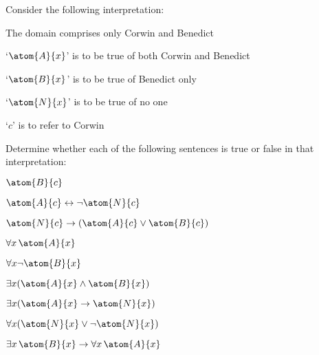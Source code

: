 \practiceproblems
\solutions
\problempart
\label{pr.TorF1}
Consider the following interpretation:
	\begin{ebullet}
		\item The domain comprises only Corwin and Benedict
		\item `$\atom{A}{x}$' is to be true of both Corwin and Benedict
		\item `$\atom{B}{x}$' is to be true of Benedict only
		\item `$\atom{N}{x}$' is to be true of no one
		\item `$c$' is to refer to Corwin
	\end{ebullet}
Determine whether each of the following sentences is true or false in that interpretation:
\begin{earg}
\item $\atom{B}{c} $
\item $\atom{A}{c}  \eiff \enot \atom{N}{c}$
\item $\atom{N}{c}  \eif (\atom{A}{c} \eor \atom{B}{c})$
\item $\forall x\, \atom{A}{x}$
\item $\forall x \enot \atom{B}{x}$
\item $\exists x(\atom{A}{x} \eand \atom{B}{x})$
\item $\exists x(\atom{A}{x} \eif \atom{N}{x})$
\item $\forall x(\atom{N}{x} \eor \enot \atom{N}{x})$
\item $\exists x\, \atom{B}{x} \eif \forall x\, \atom{A}{x}$
\end{earg}

